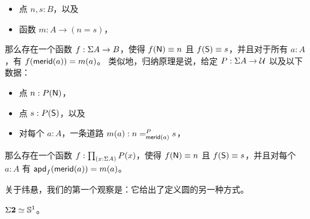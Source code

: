\begin{itemize}
\item 点 $n,s:B$，以及
\item 函数 $m:A \to (n=s)$，
\end{itemize}

那么存在一个函数 $f:\susp A \to B$，使得 $f(\north)\jdeq n$ 且 $f(\south)\jdeq s$，并且对于所有 $a:A$，有 $\ap f {\merid(a)} = m(a)$。
%
类似地，归纳原理是说，给定 $P:\susp A \to \type$ 以及以下数据：

\begin{itemize}
\item 点 $n:P(\north)$，
\item 点 $s:P(\south)$，以及
\item 对每个 $a:A$，一条道路 $m(a):\dpath P{\merid(a)}ns$，
\end{itemize}

那么存在一个函数 $f:\prd{x:\susp A} P(x)$，使得 $f(\north)\jdeq n$ 且 $f(\south)\jdeq s$，并且对每个 $a:A$ 有 $\apd f {\merid(a)} = m(a)$。

关于纬悬，我们的第一个观察是：它给出了定义圆的另一种方式。

\begin{lem}\label{thm:suspbool}
  $\eqv{\susp\bool}{\Sn^1}$。
\end{lem}

